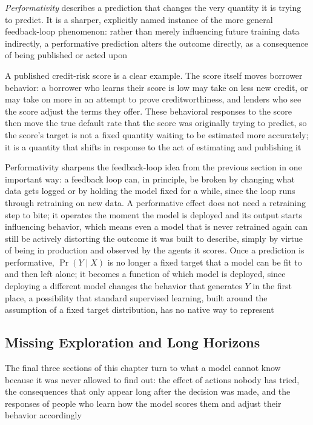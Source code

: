 \begin{definition}
  \emph{Performativity} describes a prediction that changes the very quantity it
  is trying to predict. It is a sharper, explicitly named instance of the more
  general feedback-loop phenomenon: rather than merely influencing future training
  data indirectly, a performative prediction alters the outcome directly, as a consequence
  of being published or acted upon
\end{definition}

A published credit-risk score is a clear example. The score itself moves
borrower behavior: a borrower who learns their score is low may take on less new
credit, or may take on more in an attempt to prove creditworthiness, and lenders
who see the score adjust the terms they offer. These behavioral responses to the
score then move the true default rate that the score was originally trying to
predict, so the score's target is not a fixed quantity waiting to be estimated more
accurately; it is a quantity that shifts in response to the act of estimating
and publishing it

Performativity sharpens the feedback-loop idea from the previous section in one important
way: a feedback loop can, in principle, be broken by changing what data gets
logged or by holding the model fixed for a while, since the loop runs through retraining
on new data. A performative effect does not need a retraining step to bite; it operates
the moment the model is deployed and its output starts influencing behavior,
which means even a model that is never retrained again can still be actively
distorting the outcome it was built to describe, simply by virtue of being in production
and observed by the agents it scores. Once a prediction is performative, $\Pr(Y \mid
X)$ is no longer a fixed target that a model can be fit to and then left alone;
it becomes a function of which model is deployed, since deploying a different model
changes the behavior that generates $Y$ in the first place, a possibility that
standard supervised learning, built around the assumption of a fixed target distribution,
has no native way to represent

\subsection{Missing Exploration and Long Horizons}
\label{sec:missing-exploration-long-horizons}

The final three sections of this chapter turn to what a model cannot know
because it was never allowed to find out: the effect of actions nobody has tried,
the consequences that only appear long after the decision was made, and the responses
of people who learn how the model scores them and adjust their behavior accordingly

